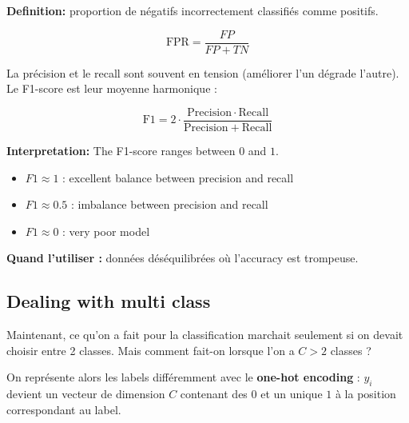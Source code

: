\documentclass[11pt,a4paper,openany]{book}
\begin{document}
\vspace{0.4cm}

\begin{defnbox}[title=False Positive Rate (FPR)]
\textbf{Definition:} proportion de négatifs incorrectement classifiés comme positifs.

\[
\mathrm{FPR} = \frac{FP}{FP + TN}
\]
\end{defnbox}

\vspace{0.4cm}

\begin{defnbox}[title=F1 Score]
La précision et le recall sont souvent en tension (améliorer l'un dégrade l'autre). Le F1-score est leur moyenne harmonique :

\[
\mathrm{F1} = 2 \cdot \frac{\mathrm{Precision} \cdot \mathrm{Recall}}{\mathrm{Precision} + \mathrm{Recall}}
\]

\vspace{0.3cm}

\textbf{Interpretation:} The F1-score ranges between $0$ and $1$.

\begin{itemize}
    \item $F1 \approx 1$ : excellent balance between precision and recall
    \item $F1 \approx 0.5$ : imbalance between precision and recall
    \item $F1 \approx 0$ : very poor model
\end{itemize}

\textbf{Quand l'utiliser :} données déséquilibrées où l'accuracy est trompeuse.
\end{defnbox}
\vspace{8cm}

\subsection{Dealing with multi class}

Maintenant, ce qu'on a fait pour la classification marchait seulement si on devait choisir entre 2 classes.
Mais comment fait-on lorsque l'on a $C > 2$ classes ?

\vspace{0.5cm}

On représente alors les labels différemment avec le \textbf{one-hot encoding} :
$y_i$ devient un vecteur de dimension $C$ contenant des $0$ et un unique $1$ à la position correspondant au label.

\vspace{0.5cm}
\end{document}

